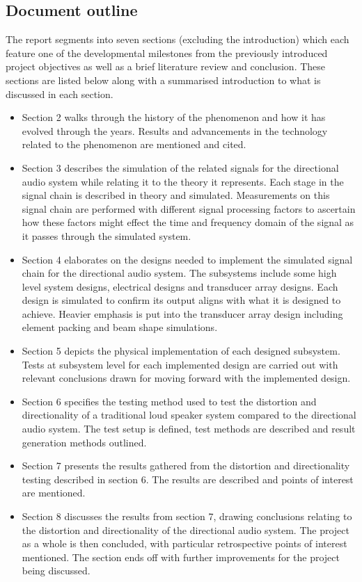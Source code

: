 \subsection{Document outline}
The report segments into seven sections (excluding the introduction) which each feature one of the developmental milestones from the previously introduced project objectives as well as a brief literature review and conclusion. These sections are listed below along with a summarised introduction to what is discussed in each section.
\begin{itemize}
    \item Section 2 walks through the history of the phenomenon and how it has evolved through the years. Results and advancements in the technology related to the phenomenon are mentioned and cited.
    \item Section 3 describes the simulation of the related signals for the directional audio system while relating it to the theory it represents. Each stage in the signal chain is described in theory and simulated. Measurements on this signal chain are performed with different signal processing factors to ascertain how these factors might effect the time and frequency domain of the signal as it passes through the simulated system.  
    \item Section 4 elaborates on the designs needed to implement the simulated signal chain for the directional audio system. The subsystems include some high level system designs, electrical designs and transducer array designs. Each design is simulated to confirm its output aligns with what it is designed to achieve. Heavier emphasis is put into the transducer array design including element packing and beam shape simulations.
    \item Section 5 depicts the physical implementation of each designed subsystem. Tests at subsystem level for each implemented design are carried out with relevant conclusions drawn for moving forward with the implemented design.
    \item Section 6 specifies the testing method used to test the distortion and directionality of a traditional loud speaker system compared to the directional audio system. The test setup is defined, test methods are described and result generation methods outlined.
    \item Section 7 presents the results gathered from the distortion and directionality testing described in section 6. The results are described and points of interest are mentioned.
    \item Section 8 discusses the results from section 7, drawing conclusions relating to the distortion and directionality of the directional audio system. The project as a whole is then concluded, with particular retrospective points of interest mentioned. The section ends off with further improvements for the project being discussed.
\end{itemize}